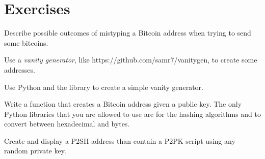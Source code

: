 \section{Exercises}

\begin{exercise}
Describe possible outcomes of mistyping a Bitcoin address when trying to send some bitcoins.
\end{exercise}

\begin{exercise}
Use a \emph{vanity generator}, like https://github.com/samr7/vanitygen, to create some addresses.
\end{exercise}

\begin{exercise}
Use Python and the  library to create a simple vanity generator.
\end{exercise}

\begin{exercise}
Write a function that creates a Bitcoin address given a public key. The only Python libraries that you are allowed to use are  for the hashing algorithms and  to convert between hexadecimal and bytes.
\end{exercise}

\begin{exercise}
Create and display a P2SH address than contain a P2PK script using any random private key.
\end{exercise}

